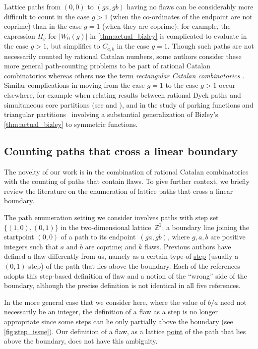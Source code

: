 \documentclass[11pt]{article}
\theoremstyle{definition} %
\numberwithin{equation}{section}
\begin{document}
Lattice paths from $(0,0)$ to $(ga,gb)$ having no flaws can be considerably more difficult to count in the case $g>1$ (when the co-ordinates of the endpoint are not coprime) than in the case $g=1$ (when they are coprime): for example, the expression $H_g$ for
$|W_0(g)|$ in \cref{thm:actual_bizley} is complicated to evaluate
in the case $g>1$, but simplifies to $C_{a,b}$ in the case $g=1$.
Though such paths are not necessarily counted by rational Catalan numbers, some authors consider these more general path-counting problems to be part of rational  Catalan combinatorics whereas others use the term \textit{rectangular Catalan combinatorics} \cite{open-berg}.
Similar complications in moving from the case $g=1$ to the case $g>1$ occur elsewhere, for example when relating results between rational Dyck paths and simultaneous core partitions (see \cite{anderson} and \cite{rat_non_coprime-vaz}), and 
in the study of parking functions and triangular partitions~\cite{park-berg, triangular-berg} involving a substantial generalization of Bizley's \cref{thm:actual_bizley} to symmetric functions.

\subsection{Counting paths that cross a linear boundary}

\label{sec:linbound}

The novelty of our work is in the combination of rational Catalan combinatorics with  the counting of paths that contain flaws.
To give further context, we briefly review the literature on the enumeration of lattice paths that cross a linear boundary.

The path enumeration setting we consider involves paths with step set $\{(1,0), (0,1)\}$ in the two-dimensional lattice~$\mathbb{Z}^2$; a boundary line joining the startpoint $(0,0)$ of a path to its endpoint~$(ga,gb)$, where $g,a,b$ are positive integers such that $a$ and $b$ are coprime; and $k$ flaws. 
Previous authors have defined a flaw differently from us, namely as a certain type of \underline{step} (usually a $(0,1)$ step) of the path that lies above the boundary.
Each of the references \cite{chen_CF_revisited,CF_cyc_shift_bdy,huq,tirrell, lattice_4_steps_flaws} adopts this step-based definition of flaw and a notion of the ``wrong'' side of the boundary, although the precise definition is not identical in all five references.

In the more general case that we consider here, where the value of $b/a$ need not necessarily be an integer, the definition of a flaw as a step is no longer appropriate since some steps can lie only partially above the boundary (see \cref{fig:step_issue}).
Our definition of a flaw, as a lattice \underline{point} of the path that lies above the boundary, does not have this ambiguity.
\end{document}
